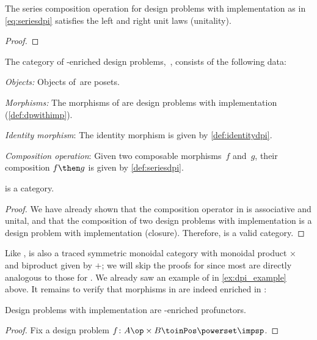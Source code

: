 \begin{lemma}
  The series composition operation for design problems with implementation as in \cref{eq:seriesdpi} satisfies the left and right unit laws (unitality).
\end{lemma}

\begin{proof}
\end{proof}


\begin{definition}
  The category of \Set-enriched design problems,~\DPI, consists of the following data:
  \begin{compactenum}
    \item \emph{Objects:}  Objects of~\DPI are posets.
    \item \emph{Morphisms:} The morphisms of \DPI are design problems with implementation (\cref{def:dpwithimp}).
    \item \emph{Identity morphism}: The identity morphism is given by \cref{def:identitydpi}.
    \item \emph{Composition operation}: Given two composable morphisms~$f$ and~$g$, their composition $f\then g$ is given by \cref{def:seriesdpi}.
  \end{compactenum}
\end{definition}

\begin{lemma}
  \DPI is a category.
\end{lemma}

\begin{proof}
  We have already shown that the composition operator in \DPI is associative and unital, and that the composition of two design problems with implementation is a design problem with implementation (closure). Therefore, \DPI is a valid category.
\end{proof}

Like \DP, \DPI is also a traced symmetric monoidal category with monoidal product $\times$ and biproduct given by $+$; we will skip the proofs for \DPI since most are directly analogous to those for \DP. We already saw an example of \DPI in \cref{ex:dpi_example} above. It remains to verify that morphisms in \DPI are indeed enriched in \Set:

\begin{proposition}
  Design problems with implementation are \Set-enriched profunctors.
\end{proposition}
\begin{proof}
  Fix a design problem $f \colon A\op \times B \toinPos \powerset \impsp$.
\end{proof}

